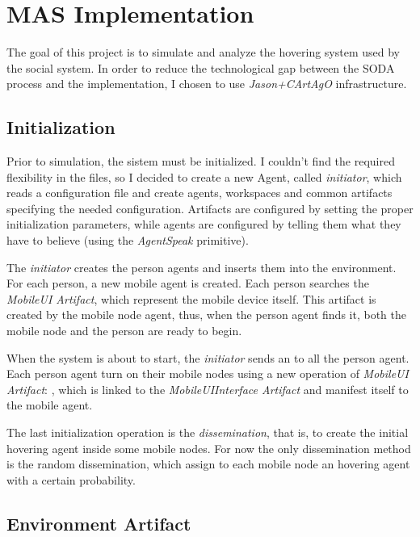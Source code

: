 \section{MAS Implementation}
\label{sec:implementation}

The goal of this project is to simulate and analyze the
hovering system used by the social system. In order to
reduce the technological gap between the SODA process and
the implementation, I chosen to use \emph{Jason+CArtAgO}
infrastructure.

\subsection{Initialization}

Prior to simulation, the sistem must be initialized. I couldn't find the
required flexibility in the  files, so I decided to create a new
Agent, called \emph{initiator}, which reads a configuration file and create
agents, workspaces and common artifacts specifying the needed configuration.
Artifacts are configured by setting the proper initialization parameters, while
agents are configured by telling them what they have to believe (using the
\emph{AgentSpeak}  primitive).

The \emph{initiator} creates the person agents and inserts them into the
environment. For each person, a new mobile agent is created. Each person
searches the \emph{MobileUI Artifact}, which represent the mobile device
itself. This artifact is created by the mobile node agent, thus, when the
person agent finds it, both the mobile node and the person are ready to begin.

When the system is about to start, the \emph{initiator} sends an
 to all the person agent. Each person agent turn on their
mobile nodes using a new operation of \emph{MobileUI Artifact}:
, which is linked to the \emph{MobileUIInterface Artifact}
and manifest itself to the mobile agent.

The last initialization operation is the \emph{dissemination}, that is, to
create the initial hovering agent inside some mobile nodes. For now the only
dissemination method is the random dissemination, which assign to each mobile
node an hovering agent with a certain probability.

\subsection{Environment Artifact}

